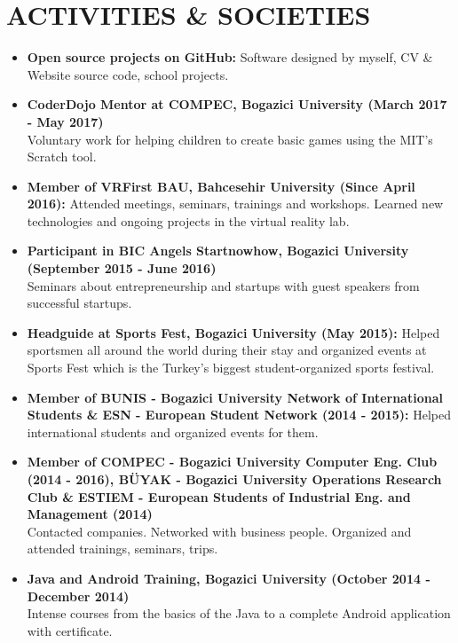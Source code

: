 \documentclass[a4paper, 10pt]{article}
\begin{document}
\section{ACTIVITIES \& SOCIETIES}
\begin{itemize}
    \item \textbf{Open source projects on GitHub:}
        Software designed by myself, CV \& Website source code, school projects.
    \item \textbf{CoderDojo Mentor at COMPEC, Bogazici University (March 2017 - May 2017)}\\
        Voluntary work for helping children to create basic games using the MIT's Scratch tool.
    \item \textbf{Member of VRFirst BAU, Bahcesehir University (Since April 2016):}
        Attended meetings, seminars, trainings and workshops. Learned new technologies and ongoing projects in the virtual reality lab.
    \item \textbf{Participant in BIC Angels Startnowhow, Bogazici University (September 2015 - June 2016)}\\
        Seminars about entrepreneurship and startups with guest speakers from successful startups.
    \item \textbf{Headguide at Sports Fest, Bogazici University (May 2015):}
        Helped sportsmen all around the world during their stay and organized events at Sports Fest which is the Turkey's biggest student-organized sports festival.
    \item \textbf{Member of BUNIS - Bogazici University Network of International Students \& ESN - European Student Network (2014 - 2015):}
        Helped international students and organized events for them.
    \item \textbf{Member of COMPEC - Bogazici University Computer Eng. Club (2014 - 2016), BÜYAK - Bogazici University Operations Research Club \& ESTIEM - European Students of Industrial Eng. and Management (2014)}\\
        Contacted companies. Networked with business people. Organized and attended trainings, seminars, trips.
    \item \textbf{Java and Android Training, Bogazici University (October 2014 - December 2014)}\\
        Intense courses from the basics of the Java to a complete Android application with certificate.
\end{itemize}
\end{document}
